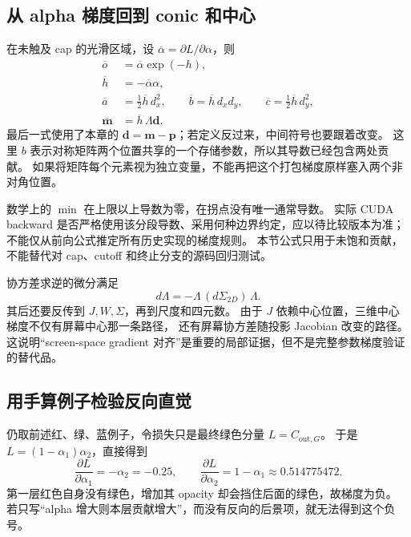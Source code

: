 \subsection{从 alpha 梯度回到 conic 和中心}

在未触及 cap 的光滑区域，设 $\overline\alpha=\partial L/\partial\alpha$，则
\begin{align}
 \overline o&=\overline\alpha\exp(-h),\\
 \overline h&=-\overline\alpha\alpha,\\
 \overline a&=\tfrac12\overline h\,d_x^2,\qquad
 \overline b=\overline h\,d_xd_y,\qquad
 \overline c=\tfrac12\overline h\,d_y^2,\\
 \overline{\mathbf m}&=\overline h\,\Lambda\mathbf d.
\end{align}
最后一式使用了本章的 $\mathbf d=\mathbf m-\mathbf p$；若定义反过来，中间符号也要跟着改变。
这里 $b$ 表示对称矩阵两个位置共享的一个存储参数，所以其导数已经包含两处贡献。
如果将矩阵每个元素视为独立变量，不能再把这个打包梯度原样塞入两个非对角位置。

数学上的 $\min$ 在上限以上导数为零，在拐点没有唯一通常导数。
实际 CUDA backward 是否严格使用该分段导数、采用何种边界约定，应以待比较版本为准；
不能仅从前向公式推定所有历史实现的梯度规则。
本节公式只用于未饱和贡献，不能替代对 cap、cutoff 和终止分支的源码回归测试。

协方差求逆的微分满足
\begin{equation}
 d\Lambda=-\Lambda\,(d\Sigma_{2D})\,\Lambda.
\end{equation}
其后还要反传到 $J,W,\Sigma$，再到尺度和四元数。
由于 $J$ 依赖中心位置，三维中心梯度不仅有屏幕中心那一条路径，
还有屏幕协方差随投影 Jacobian 改变的路径。
这说明“screen-space gradient 对齐”是重要的局部证据，但不是完整参数梯度验证的替代品。

\subsection{用手算例子检验反向直觉}

仍取前述红、绿、蓝例子，令损失只是最终绿色分量 $L=C_{\mathrm{out},G}$。
于是 $L=(1-\alpha_1)\alpha_2$，直接得到
\begin{equation}
 \frac{\partial L}{\partial\alpha_1}=-\alpha_2=-0.25,
 \qquad
 \frac{\partial L}{\partial\alpha_2}=1-\alpha_1\approx0.514775472.
\end{equation}
第一层红色自身没有绿色，增加其 opacity 却会挡住后面的绿色，故梯度为负。
若只写“alpha 增大则本层贡献增大”，而没有反向的后景项，就无法得到这个负号。

